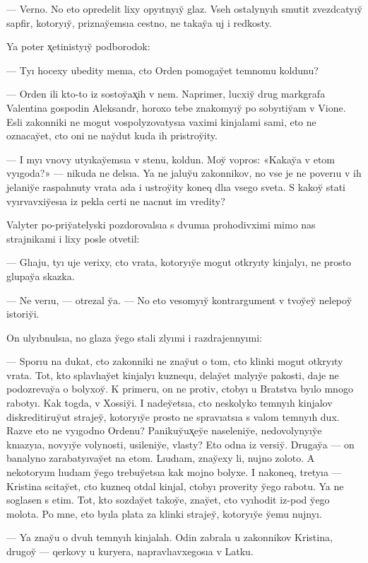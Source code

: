 \documentclass[10pt]{book}
\begin{document}
— Verno. No eto opredelit lixy opyıtnyıy̆ glaz. Vseh ostalynyıh smutit zvezdcatyıy̆ sapfir, kotoryıy̆, priznay̆emsıa cestno, ne takay̆a uj i redkosty.

Ya poter x̨etinistyıy̆ podborodok:

— Tyı hocexy ubedity menıa, cto Orden pomogay̆et temnomu koldunu?

— Orden ili kto-to iz sostoy̆ax̨ih v nem. Naprimer, lucxiy̆ drug markgrafa Valentina gospodin Aleksandr, horoxo tebe znakomyıy̆ po sobyıtiy̆am v Vione. Esli zakonniki ne mogut vospolyzovatysıa vaximi kinjalami sami, eto ne oznacay̆et, cto oni ne nay̆dut kuda ih pristroy̆ity.

— I myı vnovy utyıkay̆emsıa v stenu, koldun. Moy̆ vopros: «Kakay̆a v etom vyıgoda?» — nikuda ne delsıa. Ya ne jaluy̆u zakonnikov, no vse je ne poverıu v ih jelaniy̆e raspahnuty vrata ada i ustroy̆ity koneq dlıa vsego sveta. S kakoy̆ stati vyırvavxiy̆esıa iz pekla certi ne nacnut im vredity?

Valyter po-priy̆atelyski pozdorovalsıa s dvumıa prohodivximi mimo nas strajnikami i lixy posle otvetil:

— Glıaju, tyı uje verixy, cto vrata, kotoryıy̆e mogut otkryıty kinjalyı, ne prosto glupay̆a skazka.

— Ne verıu, — otrezal y̆a. — No eto vesomyıy̆ kontrargument v tvoy̆ey̆ nelepoy̆ istoriy̆i.

On ulyıbnulsıa, no glaza y̆ego stali zlyımi i razdrajennyımi:

— Sporıu na dukat, cto zakonniki ne znay̆ut o tom, cto klinki mogut otkryıty vrata. Tot, kto splavlıay̆et kinjalyı kuznequ, delay̆et malyıy̆e pakosti, daje ne podozrevay̆a o bolyxoy̆. K primeru, on ne protiv, ctobyı u Bratstva byılo mnogo rabotyı. Kak togda, v Xossiy̆i. I nadey̆etsıa, cto neskolyko temnyıh kinjalov diskreditiruy̆ut strajey̆, kotoryıy̆e prosto ne spravıatsıa s valom temnyıh dux. Razve eto ne vyıgodno Ordenu? Panikuy̆ux̨ey̆e naseleniy̆e, nedovolynyıy̆e knıazyıa, novyıy̆e volynosti, usileniy̆e, vlasty? Eto odna iz versiy̆. Drugay̆a — on banalyno zarabatyıvay̆et na etom. Lıudıam, znay̆exy li, nujno zoloto. A nekotoryım lıudıam y̆ego trebuy̆etsıa kak mojno bolyxe. I nakoneq, tretyıa — Kristina scitay̆et, cto kuzneq otdal kinjal, ctobyı proverity y̆ego rabotu. Ya ne soglasen s etim. Tot, kto sozday̆et takoy̆e, znay̆et, cto vyıhodit iz-pod y̆ego molota. Po mne, eto byıla plata za klinki strajey̆, kotoryıy̆e y̆emu nujnyı.

— Ya znay̆u o dvuh temnyıh kinjalah. Odin zabrala u zakonnikov Kristina, drugoy̆ — qerkovy u kuryera, napravlıavxegosıa v Latku.
\end{document}
